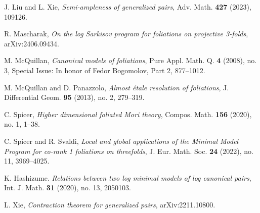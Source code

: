 \documentclass[11pt]{amsart}
\numberwithin{equation}{section}
\theoremstyle{definition}
\theoremstyle{definition}
\theoremstyle{definition}
\begin{document}
\begin{thebibliography}{99}
 J. Liu and L. Xie, \textit{Semi-ampleness of generalized pairs}, Adv. Math. \textbf{427} (2023), 109126.

 R. Mascharak, \textit{On the log Sarkisov program for foliations on projective 3-folds}, arXiv:2406.09434.

 M. McQuillan, \textit{Canonical models of foliations}, Pure Appl. Math. Q. \textbf{4} (2008), no. 3, Special Issue: In honor of Fedor Bogomolov, Part 2, 877--1012.

 M. McQuillan and D. Panazzolo, \textit{Almost \'etale resolution of foliations}, J. Differential Geom. \textbf{95} (2013), no. 2, 279--319.


 C. Spicer, \textit{Higher dimensional foliated Mori theory}, Compos. Math. \textbf{156} (2020), no. 1, 1--38.

 C. Spicer and R. Svaldi, \textit{Local and global applications of the Minimal Model Program for co-rank 1 foliations on threefolds}, J. Eur. Math. Soc. \textbf{24} (2022), no. 11, 3969--4025.

 K. Hashizume. \textit{Relations between two log minimal models of log canonical pairs}, Int. J. Math. \textbf{31} (2020), no. 13, 2050103. 

 L. Xie, \textit{Contraction theorem for generalized pairs}, arXiv:2211.10800.
\end{thebibliography}
\end{document}
